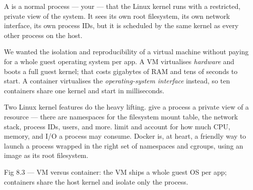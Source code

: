 
 A  is a normal process --- your  --- that the Linux kernel runs with a restricted, private view of the system. It sees its own root filesystem, its own network interface, its own process IDs, but it is scheduled by the same kernel as every other process on the host.

 We wanted the isolation and reproducibility of a virtual machine without paying for a whole guest operating system per app. A VM virtualises \emph{hardware} and boots a full guest kernel; that costs gigabytes of RAM and tens of seconds to start. A container virtualises the \emph{operating-system interface} instead, so ten containers share one kernel and start in milliseconds.

 Two Linux kernel features do the heavy lifting.  give a process a private view of a resource --- there are namespaces for the filesystem mount table, the network stack, process IDs, users, and more.  limit and account for how much CPU, memory, and I/O a process may consume. Docker is, at heart, a friendly way to launch a process wrapped in the right set of namespaces and cgroups, using an image as its root filesystem.

\begin{wbfigure}{Fig 8.3 --- VM versus container: the VM ships a whole guest OS per app; containers share the host kernel and isolate only the process.}
\end{wbfigure}

